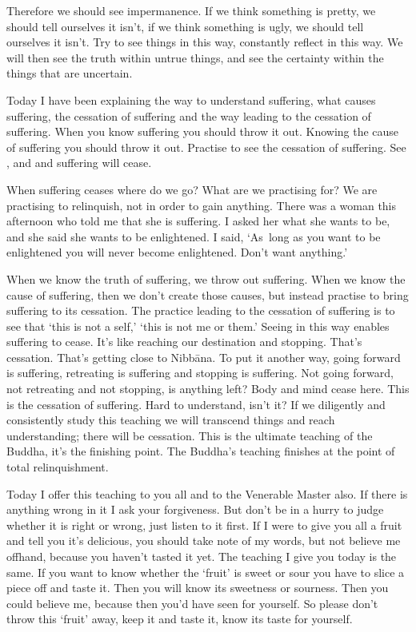 Therefore we should see impermanence. If we think something is pretty, we should tell ourselves it isn't, if we think something is ugly, we should tell ourselves it isn't. Try to see things in this way, constantly reflect in this way. We will then see the truth within untrue things, and see the certainty within the things that are uncertain.

Today I have been explaining the way to understand suffering, what causes suffering, the cessation of suffering and the way leading to the cessation of suffering. When you know suffering you should throw it out. Knowing the cause of suffering you should throw it out. Practise to see the cessation of suffering. See ,  and  and suffering will cease.

When suffering ceases where do we go? What are we practising for? We are practising to relinquish, not in order to gain anything. There was a woman this afternoon who told me that she is suffering. I asked her what she wants to be, and she said she wants to be enlightened. I said, `As~long as you want to be enlightened you will never become enlightened. Don't want anything.'

When we know the truth of suffering, we throw out suffering. When we know the cause of suffering, then we don't create those causes, but instead practise to bring suffering to its cessation. The practice leading to the cessation of suffering is to see that `this is not a self,' `this is not me or them.' Seeing in this way enables suffering to cease. It's like reaching our destination and stopping. That's cessation. That's getting close to Nibb\=ana. To put it another way, going forward is suffering, retreating is suffering and stopping is suffering. Not going forward, not retreating and not stopping, is anything left? Body and mind cease here. This is the cessation of suffering. Hard to understand, isn't it? If we diligently and consistently study this teaching we will transcend things and reach understanding; there will be cessation. This is the ultimate teaching of the Buddha, it's the finishing point. The Buddha's teaching finishes at the point of total relinquishment.

Today I offer this teaching to you all and to the Venerable Master also. If there is anything wrong in it I ask your forgiveness. But don't be in a hurry to judge whether it is right or wrong, just listen to it first. If I were to give you all a fruit and tell you it's delicious, you should take note of my words, but not believe me offhand, because you haven't tasted it yet. The teaching I give you today is the same. If you want to know whether the `fruit' is sweet or sour you have to slice a piece off and taste it. Then you will know its sweetness or sourness. Then you could believe me, because then you'd have seen for yourself. So please don't throw this `fruit' away, keep it and taste it, know its taste for yourself.

